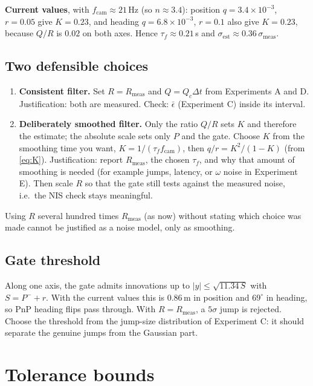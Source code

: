 \documentclass[11pt,a4paper]{article}
\begin{document}
\textbf{Current values}, with $f_\text{cam}\approx21$\,Hz (so $n\approx3.4$):
position $q=3.4\times10^{-3}$, $r=0.05$ give $K=0.23$, and heading
$q=6.8\times10^{-3}$, $r=0.1$ also give $K=0.23$, because $Q/R$ is $0.02$
on both axes. Hence $\tau_f\approx0.21$\,s and $\sigma_\text{est}\approx0.36\,\sigma_\text{meas}$.

\subsection{Two defensible choices}
\begin{enumerate}[leftmargin=*]
\item \textbf{Consistent filter.} Set $R=R_\text{meas}$ and $Q=Q_c\Delta t$
      from Experiments A and D. Justification: both are measured. Check:
      $\bar\epsilon$ (Experiment C) inside its interval.
\item \textbf{Deliberately smoothed filter.} Only the ratio $Q/R$ sets $K$
      and therefore the estimate; the absolute scale sets only $P$ and the
      gate. Choose $K$ from the smoothing time you want,
      $K=1/(\tau_f f_\text{cam})$, then $q/r=K^2/(1-K)$ (from \eqref{eq:K}).
      Justification: report $R_\text{meas}$, the chosen $\tau_f$, and why
      that amount of smoothing is needed (for example jumps, latency, or
      $\omega$ noise in Experiment E). Then scale $R$ so that the gate still
      tests against the measured noise, i.e.\ the NIS check stays meaningful.
\end{enumerate}
Using $R$ several hundred times $R_\text{meas}$ (as now) without stating
which choice was made cannot be justified as a noise model, only as
smoothing.

\subsection{Gate threshold}
Along one axis, the gate admits innovations up to
$|y|\le\sqrt{11.34\,S}$ with $S=P^-+r$. With the current values this is
0.86\,m in position and $69^\circ$ in heading, so PnP heading flips pass
through. With $R=R_\text{meas}$, a $5\sigma$ jump is rejected. Choose the
threshold from the jump-size distribution of Experiment C: it should
separate the genuine jumps from the Gaussian part.

\section{Tolerance bounds}
\label{sec:bounds}
\end{document}
